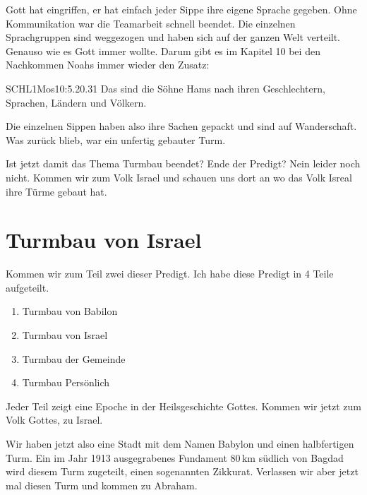 \documentclass[14pt]{../../inc/mybib}
\newenvironment{block}[1][]{%
  \vspace{1.5em}%
  \noindent\textbf{#1}\par%
  \vspace{0.0em}%
}{%
  \vspace{1em}%
}
\begin{document}
\begin{block}
    Gott hat eingriffen, er hat einfach jeder Sippe ihre eigene Sprache gegeben. Ohne Kommunikation war die Teamarbeit schnell beendet. Die einzelnen Sprachgruppen sind weggezogen und haben sich auf der ganzen Welt verteilt. Genauso wie es Gott immer wollte.
    Darum gibt es im Kapitel 10 bei den Nachkommen Noahs immer wieder den Zusatz:
    \begin{bibelbox}{SCHL}{1Mos}{10:5.20.31}
        Das sind die Söhne Hams nach ihren Geschlechtern, Sprachen, Ländern und Völkern.
    \end{bibelbox}    
    
    Die einzelnen Sippen haben also ihre Sachen gepackt und sind auf Wanderschaft. Was zurück blieb, war ein unfertig gebauter Turm.
\end{block}
\begin{block}
    Ist jetzt damit das Thema Turmbau beendet? Ende der Predigt? Nein leider noch nicht. Kommen wir zum Volk Israel und schauen uns dort an wo das Volk Isreal ihre Türme gebaut hat.
    
    \section{Turmbau von Israel}
    Kommen wir zum Teil zwei dieser Predigt. Ich habe diese Predigt in 4 Teile aufgeteilt.  
    \begin{enumerate}
        \item Turmbau von Babilon
        \item Turmbau von Israel
        \item Turmbau der Gemeinde
        \item Turmbau Persönlich
    \end{enumerate}
    Jeder Teil zeigt eine Epoche in der Heilsgeschichte Gottes. Kommen wir jetzt zum Volk Gottes, zu Israel.
\end{block}
\begin{block}
    Wir haben jetzt also eine Stadt mit dem Namen Babylon und einen halbfertigen Turm. Ein im Jahr 1913 ausgegrabenes Fundament 80\,km südlich von Bagdad wird diesem Turm zugeteilt, einen sogenannten Zikkurat. Verlassen wir aber jetzt mal diesen Turm und kommen zu Abraham.
\end{block}
\end{document}
